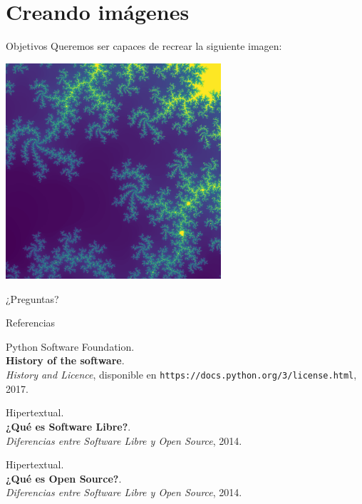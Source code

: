 \documentclass{beamer}
\begin{document}
  \section{Creando imágenes}
  \begin{frame}{Objetivos}
    Queremos ser capaces de recrear la siguiente imagen:
    \begin{center}
      \includegraphics[width=0.6\textwidth]{imgs/mandel}\hspace{0.5cm}
    \end{center}
  \end{frame}

  \begin{frame}[standout]
    ¿Preguntas?
  \end{frame}

  \begin{frame}{Referencias}
    \begin{enumerate}[{[}1{]}]
      \item Python Software Foundation.\\
      \textbf{History of the software}.\\
      \textit{History and Licence},
      disponible en \texttt{https://docs.python.org/3/license.html}, 2017.

      \item Hipertextual.\\
      \textbf{¿Qué es Software Libre?}.\\
      \textit{Diferencias entre Software Libre y Open Source}, 2014.

      \item Hipertextual.\\
      \textbf{¿Qué es Open Source?}.\\
      \textit{Diferencias entre Software Libre y Open Source}, 2014.
    \end{enumerate}
  \end{frame}
\end{document}
